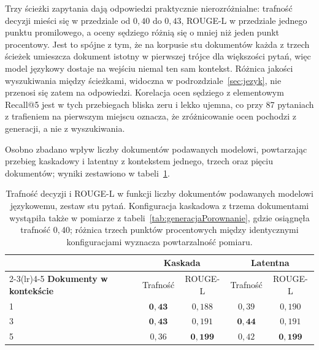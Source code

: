 Trzy ścieżki zapytania dają odpowiedzi praktycznie nierozróżnialne: trafność decyzji mieści się
w przedziale od $0{,}40$ do $0{,}43$, ROUGE-L w przedziale jednego punktu promilowego, a oceny
sędziego różnią się o mniej niż jeden punkt procentowy. Jest to spójne z tym, że na korpusie stu
dokumentów każda z trzech ścieżek umieszcza dokument istotny w pierwszej trójce dla większości
pytań, więc model językowy dostaje na wejściu niemal ten sam kontekst. Różnica jakości
wyszukiwania między ścieżkami, widoczna w podrozdziale~\ref{sec:jezyk}, nie przenosi się zatem
na odpowiedzi. Korelacja ocen sędziego z elementowym Recall@5 jest w tych przebiegach bliska
zeru i lekko ujemna, co przy 87 pytaniach z trafieniem na pierwszym miejscu oznacza, że
zróżnicowanie ocen pochodzi z generacji, a nie z wyszukiwania.

Osobno zbadano wpływ liczby dokumentów podawanych modelowi, powtarzając przebieg kaskadowy
i latentny z kontekstem jednego, trzech oraz pięciu dokumentów; wyniki zestawiono
w tabeli~\ref{tab:generacjaK}.

\begin{table}[htbp]
\centering
\small
\begin{tabular}{@{}lcccc@{}}
\toprule
& \multicolumn{2}{c}{\textbf{Kaskada}} & \multicolumn{2}{c}{\textbf{Latentna}} \\
\cmidrule(lr){2-3}\cmidrule(lr){4-5}
\textbf{Dokumenty w kontekście} & Trafność & ROUGE-L & Trafność & ROUGE-L \\
\midrule
1 & $\mathbf{0{,}43}$ & $0{,}188$ & $0{,}39$ & $0{,}190$ \\
3 & $\mathbf{0{,}43}$ & $0{,}191$ & $\mathbf{0{,}44}$ & $0{,}191$ \\
5 & $0{,}36$ & $\mathbf{0{,}199}$ & $0{,}42$ & $\mathbf{0{,}199}$ \\
\bottomrule
\end{tabular}
\caption{Trafność decyzji i ROUGE-L w funkcji liczby dokumentów podawanych modelowi
językowemu, zestaw stu pytań. Konfiguracja kaskadowa z trzema dokumentami wystąpiła także
w pomiarze z tabeli~\ref{tab:generacjaPorownanie}, gdzie osiągnęła trafność $0{,}40$; różnica
trzech punktów procentowych między identycznymi konfiguracjami wyznacza powtarzalność pomiaru.}
\label{tab:generacjaK}
\end{table}

